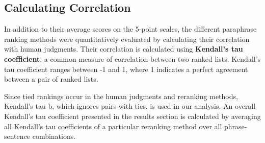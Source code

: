 \documentclass[11pt]{article}
\begin{document}


\vspace{-.2cm}


\subsection{Calculating Correlation}
In addition to their average scores on the 5-point scales, the different paraphrase ranking methods were quantitatively evaluated by calculating their correlation with human judgments.  
Their correlation is calculated using {\bf Kendall's tau coefficient}, a common measure of correlation between two ranked lists. Kendall's tau coefficient ranges between -1 and 1, where 1 indicates a perfect agreement between a pair of ranked lists. 

Since tied rankings occur in the human judgments and reranking methods, Kendall's tau b, which ignores pairs with ties, is used in our analysis. An overall Kendall's tau coefficient presented in the results section is calculated by averaging all Kendall's tau coefficients of a particular reranking method over all phrase-sentence combinations. 


\end{document}
